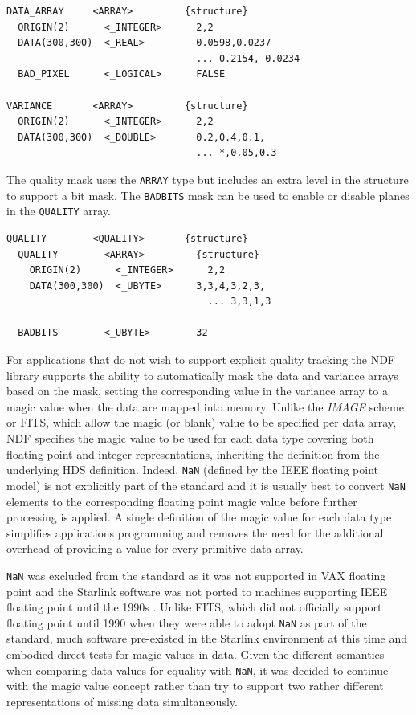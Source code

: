\documentclass[final,authoryear,5p,times,twocolumn]{elsarticle}
\begin{document}
{\small
\begin{verbatim}
DATA_ARRAY     <ARRAY>         {structure}
  ORIGIN(2)      <_INTEGER>      2,2
  DATA(300,300)  <_REAL>         0.0598,0.0237
                                 ... 0.2154, 0.0234
  BAD_PIXEL      <_LOGICAL>      FALSE

VARIANCE       <ARRAY>         {structure}
  ORIGIN(2)      <_INTEGER>      2,2
  DATA(300,300)  <_DOUBLE>       0.2,0.4,0.1,
                                 ... *,0.05,0.3
\end{verbatim}
}

The quality mask uses the \texttt{ARRAY} type but includes an extra
level in the structure to support a bit mask. The \texttt{BADBITS}
mask can be used to enable or disable planes in the \texttt{QUALITY} array.

{\small
\begin{verbatim}
QUALITY        <QUALITY>       {structure}
  QUALITY        <ARRAY>         {structure}
    ORIGIN(2)      <_INTEGER>      2,2
    DATA(300,300)  <_UBYTE>      3,3,4,3,2,3,
                                   ... 3,3,1,3

  BADBITS        <_UBYTE>        32
\end{verbatim}
}

For applications that do not wish to support explicit quality tracking
the NDF library supports the ability to automatically mask the data
and variance arrays based on the mask, setting the corresponding value
in the variance array to a magic value when the data are mapped into
memory. Unlike the \emph{IMAGE} scheme
or FITS, which allow the magic (or blank) value to be specified per
data array, NDF specifies the magic value to be used for each data type
covering both floating point and integer representations, inheriting
the definition from the underlying HDS definition. Indeed,
\texttt{NaN} (defined by the IEEE floating point model) is not explicitly part of the standard and it is usually
best to convert \texttt{NaN} elements to the corresponding floating point magic
value before further processing is applied. A single definition of the
magic value for each data type simplifies applications programming and
removes the need for the additional overhead of providing a value for
every primitive data array.

\texttt{NaN} was excluded from the standard as it was not
supported in VAX floating point \citep[see e.g.][]{660194} and the Starlink
software was not ported to machines supporting IEEE floating point
until the 1990s \citep[e.g.,][]{1991STARB...8...11C}. Unlike FITS, which
did not officially support floating point until 1990
\citep{1989FPFITS,1991BAAS...23..993S} when they were able to adopt
\texttt{NaN} as part of the standard, much software pre-existed
in the Starlink environment at this time and embodied
direct tests for magic values in data. Given the different semantics
when comparing data values for equality with \texttt{NaN}, it was decided to
continue with the magic value concept rather than try to support two
rather different representations of missing data simultaneously.
\end{document}
